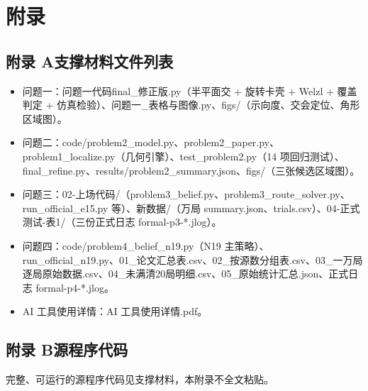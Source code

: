 \documentclass[12pt,a4paper]{article}
\begin{document}
\clearpage
\section*{附录}
\subsection*{附录 A\quad 支撑材料文件列表}
\begin{itemize}
\item 问题一：问题一代码final\_修正版.py（半平面交 + 旋转卡壳 + Welzl + 覆盖判定 + 仿真检验）、问题一\_表格与图像.py、figs/（示向度、交会定位、角形区域图）。
\item 问题二：code/problem2\_model.py、problem2\_paper.py、problem1\_localize.py（几何引擎）、test\_problem2.py（14 项回归测试）、final\_refine.py、results/problem2\_summary.json、figs/（三张候选区域图）。
\item 问题三：02-上场代码/（problem3\_belief.py、problem3\_route\_solver.py、run\_official\_e15.py 等）、新数据/（万局 summary.json、trials.csv）、04-正式测试-表1/（三份正式日志 formal-p3-*.jlog）。
\item 问题四：code/problem4\_belief\_n19.py（N19 主策略）、run\_official\_n19.py、01\_论文汇总表.csv、02\_按源数分组表.csv、03\_一万局逐局原始数据.csv、04\_未满清20局明细.csv、05\_原始统计汇总.json、正式日志 formal-p4-*.jlog。
\item AI 工具使用详情：AI 工具使用详情.pdf。
\end{itemize}

\subsection*{附录 B\quad 源程序代码}
完整、可运行的源程序代码见支撑材料，本附录不全文粘贴。
\end{document}
